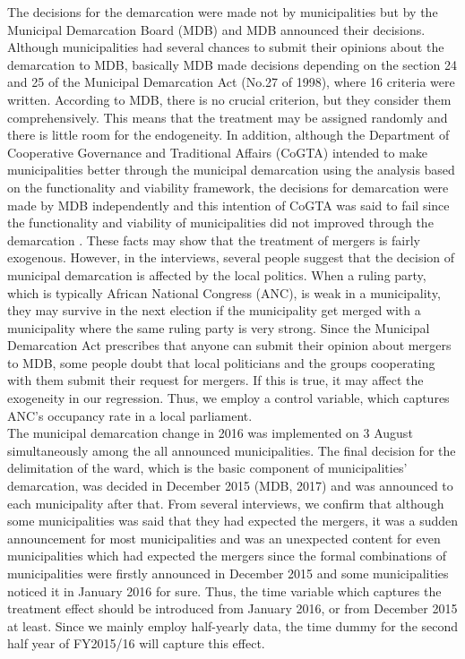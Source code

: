 \documentclass[dvipdfmx]{jsarticle}
\begin{document}
\quad The decisions for the demarcation were made not by municipalities but by the Municipal Demarcation Board (MDB) and MDB announced their decisions. Although municipalities had several chances to submit their opinions about the demarcation to MDB, basically MDB made decisions depending on the section 24 and 25 of the Municipal Demarcation Act (No.27 of 1998), where 16 criteria were written. According to MDB, there is no crucial criterion, but they consider them comprehensively. This means that the treatment may be assigned randomly and there is little room for the endogeneity. In addition, although the Department of Cooperative Governance and Traditional Affairs (CoGTA) intended to make municipalities better through the municipal demarcation using the analysis based on the functionality and viability framework, the decisions for demarcation were made by MDB independently and this intention of CoGTA was said to fail since the functionality and viability of municipalities did not improved through the demarcation \citep{Ncube2017}. These facts may show that the treatment of mergers is fairly exogenous. However, in the interviews, several people suggest that the decision of municipal demarcation is affected by the local politics. When a ruling party, which is typically African National Congress (ANC), is weak in a municipality, they may survive in the next election if the municipality get merged with a municipality where the same ruling party is very strong. Since the Municipal Demarcation Act prescribes that anyone can submit their opinion about mergers to MDB, some people doubt that local politicians and the groups cooperating with them submit their request for mergers. If this is true, it may affect the exogeneity in our regression. Thus, we employ a control variable, which captures ANC's occupancy rate in a local parliament.\\
\quad The municipal demarcation change in 2016 was implemented on 3 August simultaneously among the all announced municipalities. The final decision for the delimitation of the ward, which is the basic component of municipalities' demarcation, was decided in December 2015 (MDB, 2017) and was announced to each municipality after that. From several interviews, we confirm that although some municipalities was said that they had expected the mergers, it was a sudden announcement for most municipalities and was an unexpected content for even municipalities which had expected the mergers since the formal combinations of municipalities were firstly announced in December 2015 and some municipalities noticed it in January 2016 for sure. Thus, the time variable which captures the treatment effect should be introduced from January 2016, or from December 2015 at least. Since we mainly employ half-yearly data, the time dummy for the second half year of FY2015/16 will capture this effect.
\end{document}
